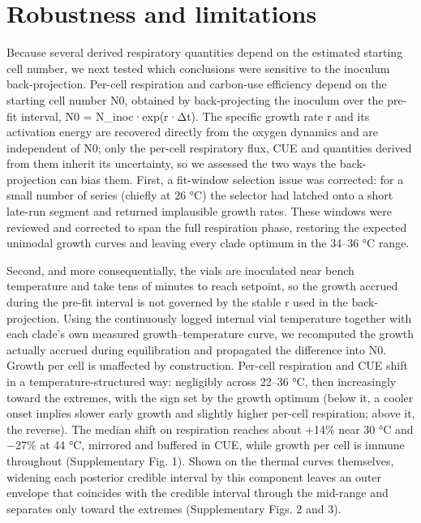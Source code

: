 \documentclass[
]{article}
\begin{document}
\section{\texorpdfstring{\textbf{Robustness and
limitations}}{Robustness and limitations}}\label{robustness-and-limitations}

Because several derived respiratory quantities depend on the estimated
starting cell number, we next tested which conclusions were sensitive to
the inoculum back-projection. Per-cell respiration and carbon-use
efficiency depend on the starting cell number N0, obtained by
back-projecting the inoculum over the pre-fit interval, N0 =
N\_inoc·exp(r·Δt). The specific growth rate r and its activation energy
are recovered directly from the oxygen dynamics and are independent of
N0; only the per-cell respiratory flux, CUE and quantities derived from
them inherit its uncertainty, so we assessed the two ways the
back-projection can bias them. First, a fit-window selection issue was
corrected: for a small number of series (chiefly at 26 °C) the selector
had latched onto a short late-run segment and returned implausible
growth rates. These windows were reviewed and corrected to span the full
respiration phase, restoring the expected unimodal growth curves and
leaving every clade optimum in the 34--36 °C range.

Second, and more consequentially, the vials are inoculated near bench
temperature and take tens of minutes to reach setpoint, so the growth
accrued during the pre-fit interval is not governed by the stable r used
in the back-projection. Using the continuously logged internal vial
temperature together with each clade's own measured growth--temperature
curve, we recomputed the growth actually accrued during equilibration
and propagated the difference into N0. Growth per cell is unaffected by
construction. Per-cell respiration and CUE shift in a
temperature-structured way: negligibly across 22--36 °C, then
increasingly toward the extremes, with the sign set by the growth
optimum (below it, a cooler onset implies slower early growth and
slightly higher per-cell respiration; above it, the reverse). The median
shift on respiration reaches about +14\% near 30 °C and −27\% at 44 °C,
mirrored and buffered in CUE, while growth per cell is immune throughout
(Supplementary Fig. 1). Shown on the thermal curves themselves, widening
each posterior credible interval by this component leaves an outer
envelope that coincides with the credible interval through the mid-range
and separates only toward the extremes (Supplementary Figs. 2 and 3).
\end{document}
